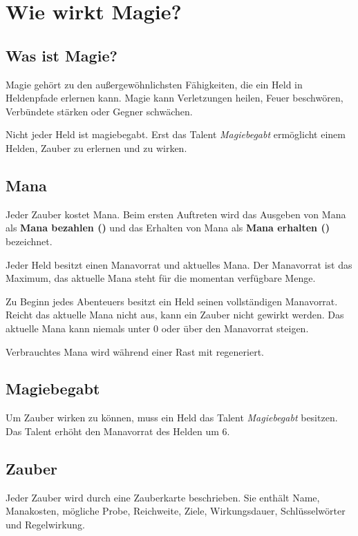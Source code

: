 \chapter{Wie wirkt Magie?}

\section{Was ist Magie?}

Magie gehört zu den außergewöhnlichsten Fähigkeiten, die ein Held in Heldenpfade erlernen kann. Magie kann Verletzungen heilen, Feuer beschwören, Verbündete stärken oder Gegner schwächen.

Nicht jeder Held ist magiebegabt. Erst das Talent \emph{Magiebegabt} ermöglicht einem Helden, Zauber zu erlernen und zu wirken.

\section{Mana}

Jeder Zauber kostet Mana. Beim ersten Auftreten wird das Ausgeben von Mana als \textbf{Mana bezahlen (\manaLoss)} und das Erhalten von Mana als \textbf{Mana erhalten (\manaGain)} bezeichnet.

Jeder Held besitzt einen Manavorrat und aktuelles Mana. Der Manavorrat ist das Maximum, das aktuelle Mana steht für die momentan verfügbare Menge.

Zu Beginn jedes Abenteuers besitzt ein Held seinen vollständigen Manavorrat. Reicht das aktuelle Mana nicht aus, kann ein Zauber nicht gewirkt werden. Das aktuelle Mana kann niemals unter 0 oder über den Manavorrat steigen.

Verbrauchtes Mana wird während einer Rast mit \manaGain{} regeneriert.

\section{Magiebegabt}

Um Zauber wirken zu können, muss ein Held das Talent \emph{Magiebegabt} besitzen. Das Talent erhöht den Manavorrat des Helden um 6.

\section{Zauber}

Jeder Zauber wird durch eine Zauberkarte beschrieben. Sie enthält Name, Manakosten, mögliche Probe, Reichweite, Ziele, Wirkungsdauer, Schlüsselwörter und Regelwirkung.

